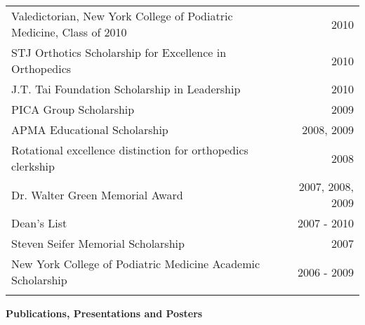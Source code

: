 \documentclass[letterpaper,10pt]{article}
\newcommand{\len}{7in}
\newcommand{\resheading}[1]{{\large \colorbox{mygrey}{
    \begin{minipage}{6.9in}{\textbf{#1}}
    \end{minipage}}}}
\begin{document}
\begin{tabular*}{\len}{@{\extracolsep{\fill}}lr}
    \\
    Valedictorian, New York College of Podiatric Medicine, Class of 2010 & 2010 \\
    STJ Orthotics Scholarship for Excellence in Orthopedics & 2010 \\
    J.T. Tai Foundation Scholarship in Leadership & 2010 \\
    PICA Group Scholarship & 2009 \\
    APMA Educational Scholarship & 2008, 2009 \\
    Rotational excellence distinction for orthopedics clerkship & 2008 \\
    Dr. Walter Green Memorial Award & 2007, 2008, 2009 \\
    Dean’s List & 2007 - 2010 \\
    Steven Seifer Memorial Scholarship & 2007 \\
    New York College of Podiatric Medicine Academic Scholarship & 2006 - 2009 \\
    \\
\end{tabular*}
\resheading{Publications, Presentations and Posters}
\end{document}
